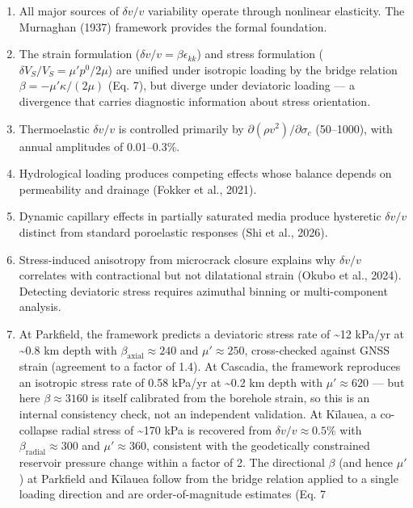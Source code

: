 \documentclass[12pt]{article}
\providecommand{\tightlist}{%
  \setlength{\itemsep}{0pt}\setlength{\parskip}{0pt}}
\begin{document}
\begin{enumerate}
\def\labelenumi{\arabic{enumi}.}
\tightlist
\item
  All major sources of \(\delta v/v\) variability operate through
  nonlinear elasticity. The Murnaghan (1937) framework provides the
  formal foundation.
\item
  The strain formulation (\(\delta v/v = \beta \epsilon_{kk}\)) and
  stress formulation (\(\delta V_S/V_S = \mu' p^0 / 2\mu\)) are unified
  under isotropic loading by the bridge relation
  \(\beta = -\mu'\kappa/(2\mu)\) (Eq. 7), but diverge under deviatoric
  loading --- a divergence that carries diagnostic information about
  stress orientation.
\item
  Thermoelastic \(\delta v/v\) is controlled primarily by
  \(\partial(\rho v^2)/\partial\sigma_c\) (50--1000), with annual
  amplitudes of 0.01--0.3\%.
\item
  Hydrological loading produces competing effects whose balance depends
  on permeability and drainage (Fokker et al., 2021).
\item
  Dynamic capillary effects in partially saturated media produce
  hysteretic \(\delta v/v\) distinct from standard poroelastic responses
  (Shi et al., 2026).
\item
  Stress-induced anisotropy from microcrack closure explains why
  \(\delta v/v\) correlates with contractional but not dilatational
  strain (Okubo et al., 2024). Detecting deviatoric stress requires
  azimuthal binning or multi-component analysis.
\item
  At Parkfield, the framework predicts a deviatoric stress rate of
  \textasciitilde12 kPa/yr at \textasciitilde0.8 km depth with
  \(\beta_{\text{axial}} \approx 240\) and \(\mu' \approx 250\),
  cross-checked against GNSS strain (agreement to a factor of 1.4). At
  Cascadia, the framework reproduces an isotropic stress rate of 0.58
  kPa/yr at \textasciitilde0.2 km depth with \(\mu' \approx 620\) ---
  but here \(\beta \approx 3160\) is itself calibrated from the borehole
  strain, so this is an internal consistency check, not an independent
  validation. At Kīlauea, a co-collapse radial stress of
  \textasciitilde170 kPa is recovered from \(\delta v/v \approx 0.5\%\)
  with \(\beta_{\text{radial}} \approx 300\) and \(\mu' \approx 360\),
  consistent with the geodetically constrained reservoir pressure change
  within a factor of 2. The directional \(\beta\) (and hence \(\mu'\))
  at Parkfield and Kīlauea follow from the bridge relation applied to a
  single loading direction and are order-of-magnitude estimates (Eq. 7

\end{enumerate}
\end{document}
